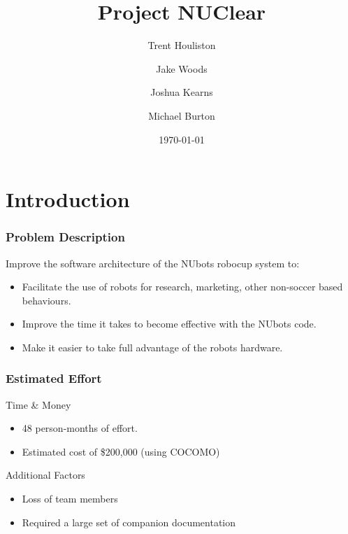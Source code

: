 \documentclass{beamer}
\title[Short title]{Project NUClear}
\author{
	Trent Houliston \and Jake Woods \and Joshua Kearns \and Michael Burton
}
\institute[UoN]
{
	University of Newcastle \\ %
	\medskip
	\textit{\{Trent.Houliston, Jake.F.Woods, Joshua.Kearns, Michael Burton\}@uon.edu.au} %
}
\date{\today}
\begin{document}
\begin{frame} %
	\titlepage %
\end{frame}

\begin{frame}
	\tableofcontents
\end{frame}

\section{Introduction}
\begin{frame}
	\frametitle{Problem Description}
		Improve the software architecture of the NUbots robocup system to:
		\begin{itemize}
			\item Facilitate the use of robots for research, marketing, other non-soccer based behaviours.
			\item Improve the time it takes to become effective with the NUbots code.
			\item Make it easier to take full advantage of the robots hardware.
		\end{itemize}
\end{frame}

\begin{frame}
	\frametitle{Estimated Effort}
		Time \& Money
		\begin{itemize}
			\item 48 person-months of effort.
			\item Estimated cost of \$200,000 (using COCOMO)
		\end{itemize}
		
		Additional Factors
		\begin{itemize}
			\item Loss of team members
			\item Required a large set of companion documentation
		\end{itemize}
\end{frame}
\end{document}
